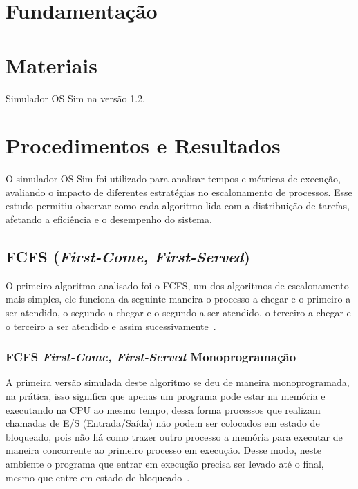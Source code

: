 \documentclass[
	12pt,				%
	oneside,   	        %
	a4paper,			%
	english,			%
	french,				%
	spanish,			%
	brazil,				%
	]{pacotes/abntex2}
\begin{document}
\section{Fundamentação}
\label{sec:fundamentacao}

\section{Materiais}
\label{sec:materiais}

Simulador OS Sim na versão 1.2.

\section{Procedimentos e Resultados}
\label{sec:procedimentos}

O simulador OS Sim foi utilizado para analisar tempos e métricas de execução, avaliando o impacto de diferentes estratégias no escalonamento de processos. Esse estudo permitiu observar como cada algoritmo lida com a distribuição de tarefas, afetando a eficiência e o desempenho do sistema.

\subsection{FCFS (\textit{First-Come, First-Served})}
\label{subsec:fcfs}

O primeiro algoritmo analisado foi o FCFS, um dos algoritmos de escalonamento mais simples, ele funciona da seguinte maneira o processo a chegar e o primeiro a ser atendido, o segundo a chegar e o segundo a ser atendido, o terceiro a chegar e o terceiro a ser atendido e assim sucessivamente~\cite{maziero2019}. 

\subsubsection{FCFS \textit{First-Come, First-Served} Monoprogramação}
\label{subsubsec:mono_fcfs}

A primeira versão simulada deste algoritmo se deu de maneira monoprogramada, na prática, isso significa que apenas um programa pode estar na memória e executando na CPU ao mesmo tempo, dessa forma processos que realizam chamadas de E/S (Entrada/Saída) não podem ser colocados em estado de bloqueado, pois não há como trazer outro processo a memória para executar de maneira concorrente ao primeiro processo em execução. Desse modo, neste ambiente o programa que entrar em execução precisa ser levado até o final, mesmo que entre em estado de bloqueado~\cite{tanenbaum2016}.
\end{document}
